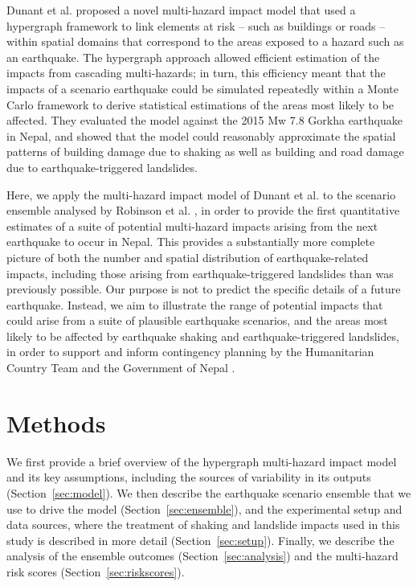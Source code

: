 \documentclass[preprint,12pt,authoryear]{elsarticle}
\begin{document}
Dunant et al. \citep{Dunant2025} proposed a novel multi-hazard impact model that used a hypergraph framework to link elements at risk -- such as buildings or roads -- within spatial domains that correspond to the areas exposed to a hazard such as an earthquake. The hypergraph approach allowed efficient estimation of the impacts from cascading multi-hazards; in turn, this efficiency meant that the impacts of a scenario earthquake could be simulated repeatedly within a Monte Carlo framework to derive statistical estimations of the areas most likely to be affected. They evaluated the model against the 2015 Mw 7.8 Gorkha earthquake in Nepal, and showed that the model could reasonably approximate the spatial patterns of building damage due to shaking as well as building and road damage due to earthquake-triggered landslides.

Here, we apply the multi-hazard impact model of Dunant et al. \citep{Dunant2025} to the scenario ensemble analysed by Robinson et al. \citep{Robinson2018}, in order to provide the first quantitative estimates of a suite of potential multi-hazard impacts arising from the next earthquake to occur in Nepal. This provides a substantially more complete picture of both the number and spatial distribution of earthquake-related impacts, including those arising from earthquake-triggered landslides than was previously possible. Our purpose is not to predict the specific details of a future earthquake. Instead, we aim to illustrate the range of potential impacts that could arise from a suite of plausible earthquake scenarios, and the areas most likely to be affected by earthquake shaking and earthquake-triggered landslides, in order to support and inform contingency planning by the Humanitarian Country Team and the Government of Nepal \citep{Sijapati2024}.

\section{Methods}
We first provide a brief overview of the hypergraph multi-hazard impact model and its key assumptions, including the sources of variability in its outputs (Section~\ref{sec:model}). We then describe the earthquake scenario ensemble that we use to drive the model (Section~\ref{sec:ensemble}), and the experimental setup and data sources, where the treatment of shaking and landslide impacts used in this study is described in more detail (Section~\ref{sec:setup}). Finally, we describe the analysis of the ensemble outcomes (Section~\ref{sec:analysis}) and the multi-hazard risk scores (Section~\ref{sec:riskscores}).
\end{document}
